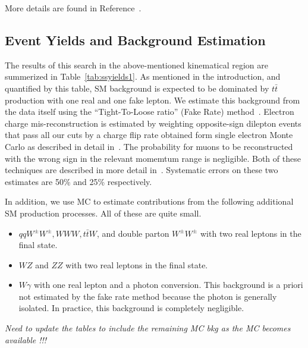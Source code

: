 More details are found in Reference~\cite{ssnote2011}.

\subsection{Event Yields and Background Estimation}
\label{eventsel}

The results of this search in the above-mentioned kinematical region are summerized in Table~\ref{tab:ssyields1}.
As mentioned in the introduction, and quantified by this table, SM background is expected to be dominated by $t\bar{t}$ production
with one real and one fake lepton.
We estimate this background from the data itself using the ``Tight-To-Loose ratio'' (Fake Rate) method~\cite{frmethod}.
Electron charge mis-reconstruction is estimated by weighting opposite-sign dilepton events that pass all our cuts
by a charge flip rate obtained form single electron Monte Carlo as described in detail in~\cite{ssnote2011}.
The probability for muons to be reconstructed with the wrong sign in the relevant momemtum range is negligible.
Both of these techniques are described in more detail in~\cite{ssnote2011}.
Systematic errors on these two estimates are 50\% and 25\% respectively.

In addition, we use MC to estimate contributions from the following additional SM production processes.
All of these are quite small.

\begin{itemize}
\item $qqW^\pm W^\pm, WWW, t\bar{t}W$, and double parton $W^\pm W^\pm$ with two real leptons in the final state.
\item $WZ$ and $ZZ$ with two real leptons in the final state.
\item $W\gamma$ with one real lepton and a photon conversion. This background is a priori not estimated by the fake rate method
because the photon is generally isolated. In practice, this background is completely negligible.
\end{itemize}

{\it Need to update the tables to include the remaining MC bkg as the MC becomes available !!!}

\newcommand{\ttdilS}{\ensuremath{\ttbar\to\ell\ell X}}
\newcommand{\ttslbS}{\ensuremath{\ttbar\to\ell(b\to\ell) X}}
\newcommand{\ttsloS}{\ensuremath{\ttbar\to\ell(b\!\!\!/\to\ell) X}}
\newcommand{\SFnn}{\ensuremath{N^{\rm Wj,raw}_{nn}}}

